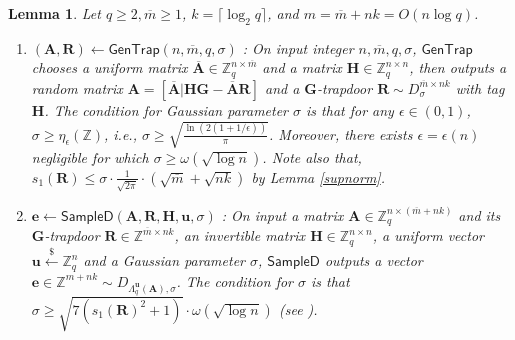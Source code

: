 \documentclass[a4paper,11pt,onecolumn]{elsarticle}
\newtheorem{lemma}[theorem]{Lemma}
\begin{document}
	\begin{lemma} \label{trapdoor} 
	Let $ q\ge 2, \overline{m} \ge 1 $, $ k = \lceil \log_2  q \rceil $, and $m = \overline{m}+nk=O(n\log q)$.
	\begin{enumerate}

	\item $(\mathbf{A},\mathbf{R})\leftarrow \mathsf{GenTrap}(n, \overline{m},q, \sigma) $ \cite[Algorithm 1]{MP12}: On input integer $n, \overline{m}, q, \sigma$,  $\mathsf{GenTrap}$ chooses a uniform matrix $ \overline{\mathbf{A}} \in \mathbb{Z}_q^{n\times \overline{m}} $ and a matrix $ \mathbf{H} \in \mathbb{Z}_q^{n\times n} $, then outputs a random matrix $ \mathbf{A} = \left[\overline{\mathbf{A}}|\mathbf{H}\mathbf{G} - \overline{\mathbf{A}}\mathbf{R} \right]  $ and a $ \mathbf{G} $-trapdoor $ \mathbf{R} \sim D_{\sigma}^{\overline{m}\times nk} $ with tag $ \mathbf{H} $. The condition for Gaussian parameter $\sigma$ is that for any $\epsilon \in (0,1)$, $ \sigma  \geq \eta_{\epsilon}(\mathbb{Z})$, i.e.,  $\sigma \geq  \sqrt{\frac{\ln(2(1+1/\epsilon))}{\pi}}$. Moreover,  there exists $\epsilon=\epsilon(n)$ negligible for which $\sigma \geq \omega(\sqrt{\log n})$. Note also that, $ s_1(\mathbf{R}) \le \sigma \cdot \frac{1}{\sqrt{2\pi}}\cdot (\sqrt{\overline{m}}+\sqrt{nk})$ by Lemma \ref{supnorm}. 
	
	\item $\mathbf{e}\leftarrow \mathsf{SampleD}(\mathbf{A},\mathbf{R},\mathbf{H},\mathbf{u},\sigma) $ \cite[Algorithm 3]{MP12}:  On input a matrix $ \mathbf{A} \in \mathbb{Z}_q^{n\times (\overline{m}+nk)} $ and its $ \mathbf{G} $-trapdoor $ \mathbf{R} \in \mathbb{Z}^{\overline{m}\times nk} $, an invertible matrix $ \mathbf{H} \in \mathbb{Z}_q^{n\times n} $, a uniform vector $\mathbf{u}\xleftarrow{\$} \mathbb{Z}_q^n$ and a Gaussian parameter $ \sigma$,   $\mathsf{SampleD}$ outputs a vector $ \mathbf{e} \in \mathbb{Z}^{m+nk} \sim D_{\Lambda_q^{\mathbf{u}}(\mathbf{A}),\sigma} $. The condition for $ \sigma$ is that $ \sigma \geq \sqrt{7( s_1(\mathbf{R})^2+1)}\cdot \omega(\sqrt{\log n})$ (see \cite[Section 5.4]{MP12}).
	



\end{enumerate}
\end{lemma}
\end{document}
